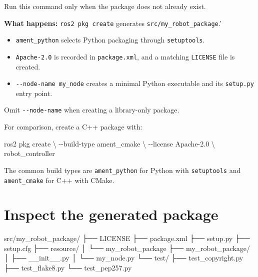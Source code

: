 \documentclass[
  australian,
  12pt,
  letterpaper,
  DIV=11,
  numbers=noendperiod,
  twoside]{scrreprt}
\newenvironment{Shaded}{\begin{snugshade}}{\end{snugshade}}
\newcommand{\AttributeTok}[1]{\textcolor[rgb]{0.40,0.45,0.13}{#1}}
\newcommand{\DataTypeTok}[1]{\textcolor[rgb]{0.68,0.00,0.00}{#1}}
\newcommand{\ExtensionTok}[1]{\textcolor[rgb]{0.00,0.23,0.31}{#1}}
\newcommand{\NormalTok}[1]{\textcolor[rgb]{0.00,0.23,0.31}{#1}}
\providecommand{\tightlist}{%
  \setlength{\itemsep}{0pt}\setlength{\parskip}{0pt}}
\begin{document}
Run this command only when the package does not already exist.

\textbf{What happens:} \texttt{ros2\ pkg\ create} generates
\texttt{src/my\_robot\_package}.'

\begin{itemize}
\tightlist
\item
  \texttt{ament\_python} selects Python packaging through
  \texttt{setuptools}.
\item
  \texttt{Apache-2.0} is recorded in \texttt{package.xml}, and a
  matching \texttt{LICENSE} file is created.
\item
  \texttt{-\/-node-name\ my\_node} creates a minimal Python executable
  and its \texttt{setup.py} entry point.
\end{itemize}

Omit \texttt{-\/-node-name} when creating a library-only package.

For comparison, create a C++ package with:

\begin{Shaded}
\begin{Highlighting}[]
\ExtensionTok{ros2}\NormalTok{ pkg create }\DataTypeTok{\textbackslash{}}
  \AttributeTok{{-}{-}build{-}type}\NormalTok{ ament\_cmake }\DataTypeTok{\textbackslash{}}
  \AttributeTok{{-}{-}license}\NormalTok{ Apache{-}2.0 }\DataTypeTok{\textbackslash{}}
\NormalTok{  robot\_controller}
\end{Highlighting}
\end{Shaded}

The common build types are \texttt{ament\_python} for Python with
\texttt{setuptools} and \texttt{ament\_cmake} for C++ with CMake.

\section{Inspect the generated
package}\label{inspect-the-generated-package}

\begin{Shaded}
\begin{Highlighting}[]
\NormalTok{src/my\_robot\_package/}
\NormalTok{├── LICENSE}
\NormalTok{├── package.xml}
\NormalTok{├── setup.py}
\NormalTok{├── setup.cfg}
\NormalTok{├── resource/}
\NormalTok{│   └── my\_robot\_package}
\NormalTok{├── my\_robot\_package/}
\NormalTok{│   ├── \_\_init\_\_.py}
\NormalTok{│   └── my\_node.py}
\NormalTok{└── test/}
\NormalTok{    ├── test\_copyright.py}
\NormalTok{    ├── test\_flake8.py}
\NormalTok{    └── test\_pep257.py}
\end{Highlighting}
\end{Shaded}
\end{document}
